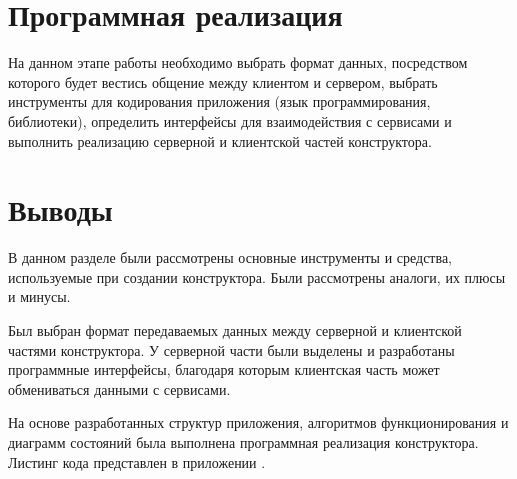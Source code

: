 
\newpage

\section{Программная реализация}

На данном этапе работы необходимо выбрать формат данных,
посредством которого будет вестись общение между клиентом и сервером,
выбрать инструменты для
кодирования приложения (язык программирования, библиотеки),
определить интерфейсы для взаимодействия с сервисами и
выполнить реализацию серверной и клиентской частей конструктора.





\newpage

\section*{Выводы}

В данном разделе были рассмотрены основные
инструменты и средства, используемые при создании
конструктора. Были рассмотрены аналоги, их плюсы и
минусы.

Был выбран формат передаваемых данных между серверной и клиентской
частями конструктора. У серверной части были выделены и разработаны
программные интерфейсы,
благодаря которым клиентская часть может обмениваться данными с сервисами.

На основе разработанных структур приложения, алгоритмов
функционирования и диаграмм состояний была выполнена программная реализация конструктора.
Листинг кода представлен в приложении .

